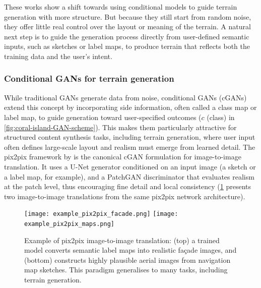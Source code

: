 These works show a shift towards using conditional models to guide terrain generation with more structure. But because they still start from random noise, they offer little real control over the layout or meaning of the terrain. A natural next step is to guide the generation process directly from user-defined semantic inputs, such as sketches or label maps, to produce terrain that reflects both the training data and the user's intent.


\subsubsection{Conditional GANs for terrain generation}
\label{sec:coral-island-sota-cGAN}

While traditional GANs generate data from noise, conditional GANs (cGANs) extend this concept by incorporating side information, often called a class map or label map, to guide generation toward user-specified outcomes \cite{Mirza2014} ($c$ (class) in \cref{fig:coral-island-GAN-scheme}). This makes them particularly attractive for structured content synthesis tasks, including terrain generation, where user input often defines large-scale layout and realism must emerge from learned detail. The pix2pix framework by \cite{Isola2017} is the canonical cGAN formulation for image-to-image translation. It uses a U-Net generator conditioned on an input image (a sketch or a label map, for example), and a PatchGAN discriminator that evaluates realism at the patch level, thus encouraging fine detail and local consistency (\cref{fig:coral-island-pix2pix-example} presents two image-to-image translations from the same pix2pix network architecture).

\begin{figure}
    \texttt{[image: example\_pix2pix\_facade.png]}
    \texttt{[image: example\_pix2pix\_maps.png]}
    \caption{Example of pix2pix image-to-image translation: (top) a trained model converts semantic label maps into realistic façade images, and (bottom) constructs highly plausible aerial images from navigation map sketches. This paradigm generalises to many tasks, including terrain generation.}
    \label{fig:coral-island-pix2pix-example}
\end{figure}


